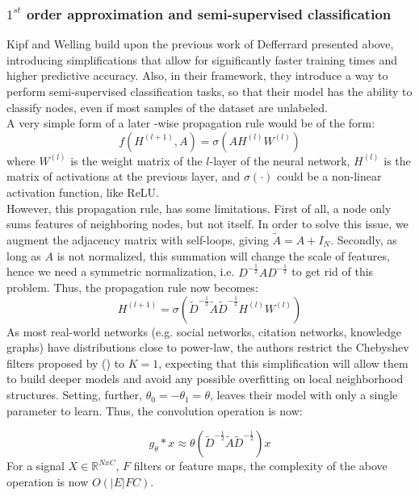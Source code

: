 \subsubsection*{$1^{st}$ order approximation and semi-supervised classification}
Kipf and Welling \cite{kipf} build upon the previous work of Defferrard
presented above, introducing simplifications that allow for significantly faster training
times and higher predictive accuracy. Also, in their framework, they introduce a
way to perform semi-supervised classification tasks, so that their model has the
ability to classify nodes, even if most samples of the dataset are unlabeled.\\
A very simple form of a later -wise propagation rule would be of the form:
\begin{equation*}
f(H^{(l+1)},A) = \sigma(AH^{(l)}W^{(l)})
\end{equation*}
where $W^{(l)}$ is the weight matrix of the $l$-layer of the neural network,
$H^{(l)}$ is the matrix of activations at the previous layer, and $\sigma(\cdot
)$ could be  a non-linear activation function, like ReLU.\\
However, this propagation rule, has some limitations. First of all, a node only
sums features of neighboring nodes, but not itself. In order to solve this issue, we augment
the adjacency matrix with self-loops, giving $\widetilde{A} = A + I_N$. Secondly, as
long as $A$ is not normalized, this summation will change the scale of features,
hence we need a symmetric normalization, i.e.
$D^{-\frac{1}{2}}AD^{-\frac{1}{2}}$ to get rid of this problem. Thus, the
propagation rule now becomes:\\
\begin{equation}
H^{(l+1)} =
\sigma(\widetilde{D}^{-\frac{1}{2}}\widetilde{A}\widetilde{D}^{-\frac{1}{2}}H^{(l)}W^{(l)})
\end{equation}
As most real-world networks (e.g. social networks, citation networks, knowledge
graphs) have distributions close to power-law, the authors restrict
the Chebyshev filters proposed by (\cite{mddef}) to $K=1$, expecting that this
simplification will allow them to build deeper models and avoid any possible
overfitting on local neighborhood structures. Setting, further, $\theta_0 =
-\theta_1 = \theta$, leaves their model with only a single parameter to learn.
Thus, the convolution operation is now:

\[
g_\theta * x \approx \theta (\widetilde{D}^{-\frac{1}{2}}\widetilde{A}\widetilde{D}^{-\frac{1}{2}})
x
\]
For a signal $X \in \mathbb{R}^{NxC}$, $F$ filters or feature maps, the
complexity of the above operation is now $O(|E|FC)$.\\

